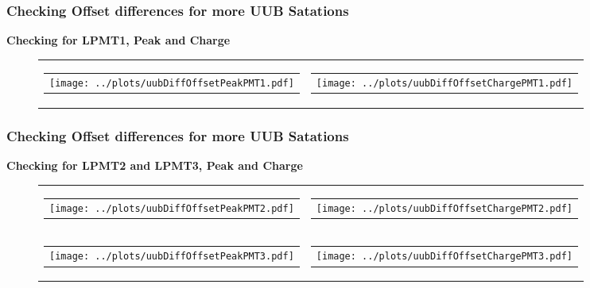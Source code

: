 \documentclass[aspectratio=169]{beamer}
\begin{document}
\begin{frame}
	\frametitle{Checking Offset differences for more UUB Satations}
	{\bf Checking for LPMT1, Peak and Charge}
	\begin{figure}
		\centering
		\begin{tabularx}{\textwidth}{CC}
			\begin{tabular}{l}
				\texttt{[image: ../plots/uubDiffOffsetPeakPMT1.pdf]}
			\end{tabular}
			&
			\begin{tabular}{l}
				\texttt{[image: ../plots/uubDiffOffsetChargePMT1.pdf]}
			\end{tabular}
		\end{tabularx}
	\end{figure}
\end{frame}


\begin{frame}
	\frametitle{Checking Offset differences for more UUB Satations}
	{\bf Checking for LPMT2 and LPMT3, Peak and Charge}
	\begin{figure}
		\centering
		\begin{tabularx}{\textwidth}{CC}
			\begin{tabular}{l}
				\texttt{[image: ../plots/uubDiffOffsetPeakPMT2.pdf]}
			\end{tabular}
			&
			\begin{tabular}{l}
				\texttt{[image: ../plots/uubDiffOffsetChargePMT2.pdf]}
			\end{tabular}
			\\
			\begin{tabular}{l}
				\texttt{[image: ../plots/uubDiffOffsetPeakPMT3.pdf]}
			\end{tabular}
			&
			\begin{tabular}{l}
				\texttt{[image: ../plots/uubDiffOffsetChargePMT3.pdf]}
			\end{tabular}
		\end{tabularx}
	\end{figure}
\end{frame}


\end{document}
